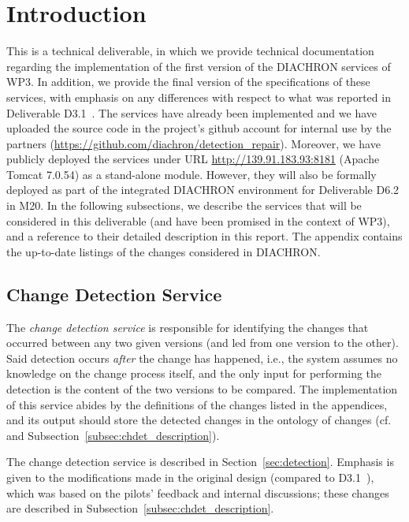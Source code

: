 \section{Introduction}
\label{sec:intro}

This is a technical deliverable, in which we provide technical documentation regarding the implementation of the first version of the DIACHRON services of WP3.
In addition, we provide the final version of the specifications of these services, with emphasis on any differences with respect to what was reported in Deliverable D3.1~\cite{d3.1}.
The services have already been implemented and we have uploaded the source code in the project's github account for internal use by the partners (\url{https://github.com/diachron/detection_repair}). 
Moreover, we have publicly deployed the services under URL \url{http://139.91.183.93:8181} (Apache Tomcat 7.0.54) as a stand-alone module. However, they will also be formally deployed as part of the integrated DIACHRON environment for Deliverable D6.2 in M20.
In the following subsections, we describe the services that will be considered in this deliverable (and have been promised in the context of WP3), and a reference to their detailed description in this report. The appendix contains the up-to-date listings of the changes considered in DIACHRON.

\subsection{Change Detection Service}

The \textit{change detection service} is responsible for identifying the changes that occurred between any two given versions (and led from one version to the other). 
Said detection occurs \emph{after} the change has happened, i.e., the system assumes no knowledge on the change process itself, and the only input for performing the detection is the content of the two versions to be compared.
The implementation of this service abides by the definitions of the changes listed in the appendices, and its output should store the detected changes in the ontology of changes (cf.~\cite{d3.1} and Subsection~\ref{subsec:chdet_description}).

The change detection service is described in Section~\ref{sec:detection}.
Emphasis is given to the modifications made in the original design (compared to D3.1~\cite{d3.1}), which was based on the pilots' feedback and internal discussions; these changes are described in 
Subsection~\ref{subsec:chdet_description}.

